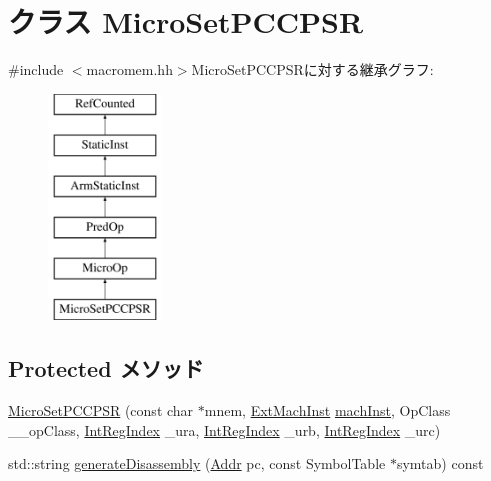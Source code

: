 \hypertarget{classArmISA_1_1MicroSetPCCPSR}{
\section{クラス MicroSetPCCPSR}
\label{classArmISA_1_1MicroSetPCCPSR}
}


{\ttfamily \#include $<$macromem.hh$>$}MicroSetPCCPSRに対する継承グラフ:\begin{figure}[H]
\begin{center}
\leavevmode
\includegraphics[height=6cm]{classArmISA_1_1MicroSetPCCPSR}
\end{center}
\end{figure}
\subsection*{Protected メソッド}
\begin{DoxyCompactItemize}
\item 
\hyperlink{classArmISA_1_1MicroSetPCCPSR_a79e8561be37a7d8c1c93a1f3cea51dfb}{MicroSetPCCPSR} (const char $\ast$mnem, \hyperlink{classStaticInst_a5605d4fc727eae9e595325c90c0ec108}{ExtMachInst} \hyperlink{classStaticInst_a744598b194ca3d4201d9414ce4cc4af4}{machInst}, OpClass \_\-\_\-opClass, \hyperlink{namespaceArmISA_ae64680ba9fb526106829d6bf92fc791b}{IntRegIndex} \_\-ura, \hyperlink{namespaceArmISA_ae64680ba9fb526106829d6bf92fc791b}{IntRegIndex} \_\-urb, \hyperlink{namespaceArmISA_ae64680ba9fb526106829d6bf92fc791b}{IntRegIndex} \_\-urc)
\item 
std::string \hyperlink{classArmISA_1_1MicroSetPCCPSR_a95d323a22a5f07e14d6b4c9385a91896}{generateDisassembly} (\hyperlink{classm5_1_1params_1_1Addr}{Addr} pc, const SymbolTable $\ast$symtab) const 
\end{DoxyCompactItemize}
